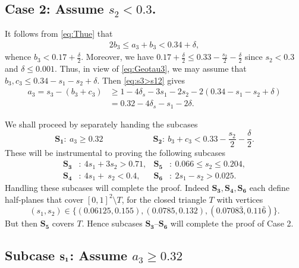 \subsection*{Case 2:  Assume $s_2< 0.3$.}

It follows from \eqref{eq:Thue} that
\begin{align}\label{eq:2b3}
2b_3 \le a_3 + b_3 < 0.34+\delta,
\end{align} whence $b_3 < 0.17+\frac{\delta}{2}$. Moreover, we have  $0.17+\frac{\delta}{2} \leq
0.33-\frac{s_2}{2}-\frac{\delta}{2}$ since $s_2<0.3$ and $\delta\leq 0.001$. Thus, in view of  \eqref{eq:Geotau3}, we may assume that $b_3,c_3 \leq  0.34-s_1-s_2+ \delta$.
Then \eqref{eq:s3>s12} gives
\begin{align}
\label{eq:a_3>0.3-s_1}
a_3 = s_3 - (b_3+c_3)
&\ge 1-4\delta_s - 3s_1 - 2s_2 - 2(0.34 - s_1 - s_2+\delta) \nonumber\\
&= 0.32-4\delta_s -s_1-2\delta.
\end{align}


We shall proceed by separately handing the subcases
$$
\mathbf{S_1}:\ a_3\geq 0.32 \qquad\qquad\qquad  \mathbf{S_2}: \
b_3+c_3<0.33-\frac{s_2}{2}-\frac{\delta}{2}.
 $$
These will be instrumental to proving the following subcases
\begin{align*}
\mathbf{S_3}&:\ 4s_1+3s_2 > 0.71, & \mathbf{S_5}&:\
0.066\leq s_2\leq
0.204,\\
\mathbf{S_4}&:\ 4s_1+\ s_2 <0.4 ,
 & \mathbf{S_6}&:\
2s_1-s_2>0.025.
\end{align*}
Handling these subcases will complete the proof.
Indeed $\mathbf{S_3}, \mathbf{S_4}, \mathbf{S_6}$
each define half-planes that  cover $[0,1]^2\setminus T$, for the closed triangle $T$ with vertices
$$
(s_1,s_2)\in \{(0.06125,0.155), (0.0785,0.132), (
0.0708\bar3,
0.11\bar 6)\}.
$$
But then
$\mathbf{S_5}$ covers $T$. Hence subcases $\mathbf{S_3}$--$\mathbf{S_6}$ will complete the proof of Case 2.

\subsection*{Subcase $\bf{S_1}$: Assume $a_3\geq  0.32$}

